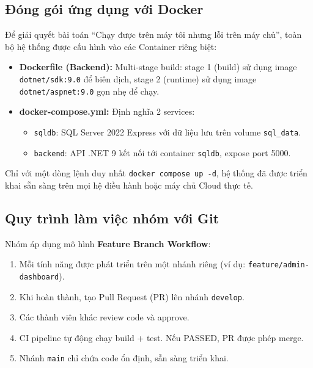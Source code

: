 \subsection{Đóng gói ứng dụng với Docker}
Để giải quyết bài toán ``Chạy được trên máy tôi nhưng lỗi trên máy chủ'', toàn bộ hệ thống được cấu hình vào các Container riêng biệt:

\begin{itemize}
    \item \textbf{Dockerfile (Backend):} Multi-stage build: stage 1 (build) sử dụng image \texttt{dotnet/sdk:9.0} để biên dịch, stage 2 (runtime) sử dụng image \texttt{dotnet/aspnet:9.0} gọn nhẹ để chạy.
    \item \textbf{docker-compose.yml:} Định nghĩa 2 services:
    \begin{itemize}
        \item \texttt{sqldb}: SQL Server 2022 Express với dữ liệu lưu trên volume \texttt{sql\_data}.
        \item \texttt{backend}: API .NET 9 kết nối tới container \texttt{sqldb}, expose port 5000.
    \end{itemize}
\end{itemize}

Chỉ với một dòng lệnh duy nhất \texttt{docker compose up -d}, hệ thống đã được triển khai sẵn sàng trên mọi hệ điều hành hoặc máy chủ Cloud thực tế.

\subsection{Quy trình làm việc nhóm với Git}
Nhóm áp dụng mô hình \textbf{Feature Branch Workflow}:
\begin{enumerate}
    \item Mỗi tính năng được phát triển trên một nhánh riêng (ví dụ: \texttt{feature/admin-dashboard}).
    \item Khi hoàn thành, tạo Pull Request (PR) lên nhánh \texttt{develop}.
    \item Các thành viên khác review code và approve.
    \item CI pipeline tự động chạy build + test. Nếu PASSED, PR được phép merge.
    \item Nhánh \texttt{main} chỉ chứa code ổn định, sẵn sàng triển khai.
\end{enumerate}
